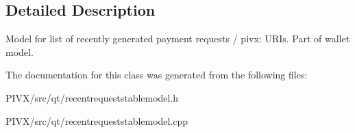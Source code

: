 \subsection{Detailed Description}
Model for list of recently generated payment requests / pivx\+: U\+R\+Is. Part of wallet model. 

The documentation for this class was generated from the following files\+:\begin{DoxyCompactItemize}
\item 
P\+I\+V\+X/src/qt/recentrequeststablemodel.\+h\item 
P\+I\+V\+X/src/qt/recentrequeststablemodel.\+cpp\end{DoxyCompactItemize}
